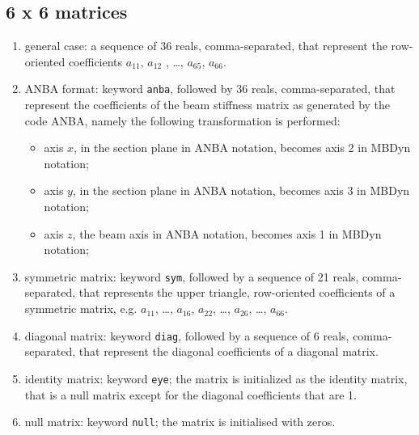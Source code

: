 \documentclass[10pt,dvips]{report}
\begin{document}
\subsection{6 x 6 matrices}
\begin{enumerate}
    \item general case: a sequence of 36 reals, comma-separated, that
    represent the row-oriented coefficients $ a_{11} $, $ a_{12}$ ,
    \ldots, $ a_{65} $, $ a_{66} $.
    \item ANBA format: keyword {\tt anba}, followed by 36 reals, 
    comma-separated, that represent the coefficients of the beam stiffness
    matrix as generated by the code ANBA, namely the following
    transformation is performed:
    \begin{itemize}
        \item axis $ x $, in the section plane in ANBA notation, 
	becomes axis 2 in MBDyn notation;    
	\item axis $ y $, in the section plane in ANBA notation, 
	becomes axis 3 in MBDyn notation;    
	\item axis $ z $, the beam axis in ANBA notation, 
	becomes axis 1 in MBDyn notation;    
    \end{itemize}
    \item symmetric matrix: keyword {\tt sym}, followed by a sequence
    of 21 reals, comma-separated, that represents the upper triangle,
    row-oriented coefficients of a symmetric matrix, 
    e.g. $ a_{11} $, \ldots , $ a_{16} $, $ a_{22} $,
    \ldots , $ a_{26} $, \ldots, $ a_{66} $.
    \item diagonal matrix: keyword {\tt diag}, followed by a sequence
    of 6 reals, comma-separated, that represent the diagonal coefficients 
    of a diagonal matrix.
    \item identity matrix: keyword {\tt eye}; the matrix is initialized
    as the identity matrix, that is a null matrix except for the diagonal 
    coefficients that are 1.
    \item null matrix: keyword {\tt null}; the matrix is initialised 
    with zeros.
\end{enumerate}
\end{document}
